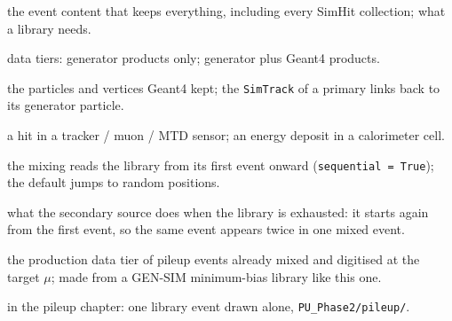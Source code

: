 \documentclass[11pt,a4paper]{article}
\newcommand{\code}[1]{\texttt{#1}}
\begin{document}
\begin{description}[style=sameline,leftmargin=0pt,itemsep=2pt]
\item[FEVTDEBUG] the event content that keeps everything, including every SimHit collection; what a library
  needs.
\item[GEN, GEN-SIM] data tiers: generator products only; generator plus Geant4 products.
\item[SimTrack, SimVertex] the particles and vertices Geant4 kept; the \code{SimTrack} of a primary links back
  to its generator particle.
\item[PSimHit, PCaloHit] a hit in a tracker / muon / MTD sensor; an energy deposit in a calorimeter cell.
\item[sequential reading] the mixing reads the library from its first event onward (\code{sequential =
  True}); the default jumps to random positions.
\item[wrap-around] what the secondary source does when the library is exhausted: it starts again from the
  first event, so the same event appears twice in one mixed event.
\item[PREMIX] the production data tier of pileup events already mixed and digitised at the target $\mu$; made
  from a GEN-SIM minimum-bias library like this one.
\item[case (b)] in the pileup chapter: one library event drawn alone, \code{PU\_Phase2/pileup/}.
\end{description}
\end{document}
